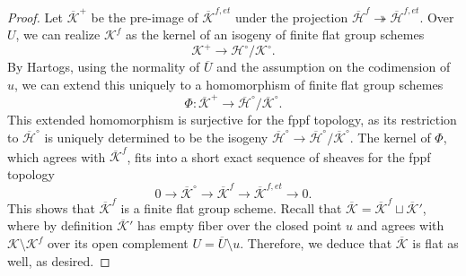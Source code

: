 \documentclass[letterpaper,11pt]{amsart}
\begin{document}
\begin{proof}
Let $\overline{\mathcal{K}}^+$ be the pre-image of $\overline{\mathcal{K}}^{f,et}$ under the projection $\overline{\mathcal{H}}^f\twoheadrightarrow \overline{\mathcal{H}}^{f,et}$. Over $U$, we can realize $\mathcal{K}^f$ as the kernel of an isogeny of finite flat group schemes 
\[
\mathcal{K}^+\to \mathcal{H}^\circ/\mathcal{K}^\circ. 
\]
By Hartogs, using the normality of $\overline{U}$ and the assumption on the codimension of $u$, we can extend this uniquely to a homomorphism of finite flat group schemes 
\[
\Phi: \overline{\mathcal{K}}^+\to \overline{\mathcal{H}}^\circ/\overline{\mathcal{K}}^\circ. 
\]
This extended homomorphism is surjective for the fppf topology, as its restriction to $\overline{\mathcal{H}}^\circ$ is uniquely determined to be the isogeny $\overline{\mathcal{H}}^\circ\to \overline{\mathcal{H}}^\circ/ \overline{\mathcal{K}}^\circ$. 
The kernel of $\Phi$,  which agrees with $\overline{\mathcal{K}}^f$, fits into a short exact sequence of sheaves for the fppf topology 
\[
0\to \overline{\mathcal{K}}^\circ \to \overline{\mathcal{K}}^f\to \overline{\mathcal{K}}^{f,et}\to 0. 
\]
This shows that $\overline{\mathcal{K}}^f$ is a finite flat group scheme. 
Recall that $\overline{\mathcal{K}} = \overline{\mathcal{K}}^f\sqcup \overline{\mathcal{K}}'$, where by definition $\overline{\mathcal{K}}'$ has empty fiber over the closed point $u$ and agrees with $\mathcal{K}\setminus \mathcal{K}^f$ over its open complement $U = \overline{U}\setminus u$. Therefore, we deduce that $\overline{\mathcal{K}}$ is flat as well, as desired. 
\end{proof}

\end{document}
